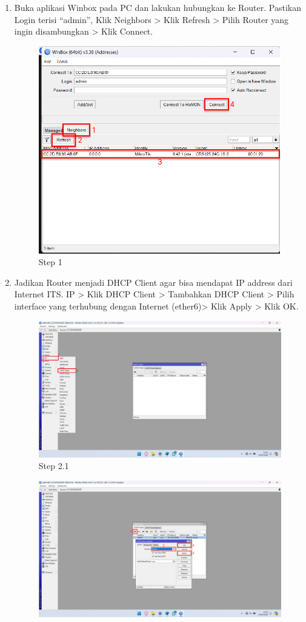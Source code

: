 \begin{center}
    \begin{enumerate}
        \item Buka aplikasi Winbox pada PC dan lakukan hubungkan ke Router. Pastikan Login terisi “admin”, Klik Neighbors > Klik Refresh > Pilih Router yang ingin disambungkan > Klik Connect.
        \begin{figure}[H]
			\centering
			\includegraphics[width=0.5\linewidth]{P3/img/Step 1.png}
			\caption{Step 1}
			\label{fig:Step 1}
		\end{figure}
        \item Jadikan Router menjadi DHCP Client agar bisa mendapat IP address dari Internet ITS. IP > Klik DHCP Client > Tambahkan DHCP Client > Pilih interface yang terhubung dengan Internet (ether6)> Klik Apply > Klik OK.
        \begin{figure}[H]
			\centering
			\includegraphics[width=0.8\linewidth]{P3/img/Step 2.1.png}
			\caption{Step 2.1}
			\label{fig:Step 2.1}
		\end{figure}
        \begin{figure}[H]
			\centering
			\includegraphics[width=0.8\linewidth]{P3/img/Step 2.2.png}

\end{figure}
\end{enumerate}
\end{center}
